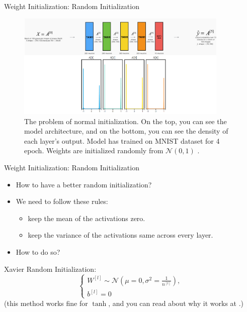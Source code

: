 \begin{frame}{Weight Initialization: Random Initialization}
	\begin{figure}[H]
		\centering
		\includegraphics[width=0.9\textwidth]{Images/normal-init.png}
		\caption{The problem of normal initialization. On the top, you can see the model architecture, and on the bottom, you can see the density of each layer's output. Model has trained on MNIST dataset for 4 epoch. Weights are initialized randomly from $\mathcal{N}(0, 1)$ \cite{katanforoosh-kunin}.}
	\end{figure}
\end{frame}

\begin{frame}{Weight Initialization: Random Initialization}
	\begin{itemize}
		\item How to have a better random initialization?
		\item We need to follow these rules:
		\begin{itemize}
			\item keep the mean of the activations zero.
			\item keep the variance of the activations same across every layer.
		\end{itemize}
		\item How to do so?
	\end{itemize}
	\pause
	\hspace*{2em}
	\begin{block}{Xavier Random Initialization:}
		\[
		\begin{cases}
			W^{[l]} \sim \mathcal{N}\left(\mu=0, \sigma^2=\frac{1}{n^{[l]}}\right), \\
			b^{[l]} = 0
		\end{cases}
		\]
		{\scriptsize (this method works fine for $\tanh$, and you can read about why it works at \cite{katanforoosh-kunin}.)}
	\end{block}
\end{frame}

